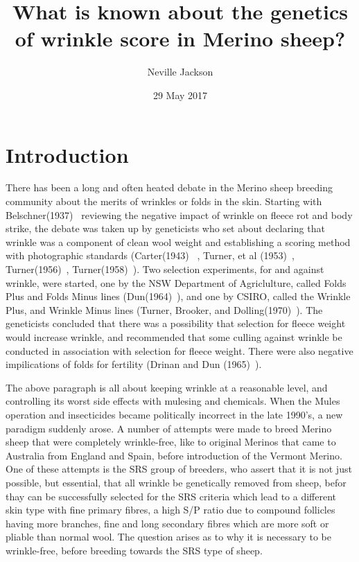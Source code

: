 \documentclass[titlepage]{article}  %
\title{What is known about the genetics of wrinkle score in Merino sheep?}
\author{Neville Jackson}
\date{29 May 2017}
\begin{document}
 
 
\maketitle      
\tableofcontents

\clearpage
\section{Introduction} 
There has been a long and often heated debate in the Merino sheep breeding community about the merits of wrinkles or folds in the skin. Starting with Belschner(1937)~\cite{bels:37} reviewing the negative impact of wrinkle on fleece rot and body strike, the debate was taken up by geneticists who set about declaring that wrinkle was a component of clean wool weight and establishing a scoring method with photographic standards (Carter(1943)~\cite{cart:43} , Turner, et al (1953)~\cite{turn:53},  Turner(1956)~\cite{turn:56}, Turner(1958)~\cite{turn:58}). Two selection experiments, for and against wrinkle, were started, one by the NSW Department of Agriclulture, called Folds Plus and Folds Minus lines (Dun(1964)~\cite{dun:64}), and one by CSIRO, called the Wrinkle Plus, and Wrinkle Minus lines (Turner, Brooker, and Dolling(1970)~\cite{turn:70}). The geneticists concluded that there was a possibility that selection for fleece weight would increase wrinkle, and recommended that some culling against wrinkle be conducted in association with selection for fleece weight. There were also negative impilications of folds for fertility (Drinan and Dun (1965)~\cite{drin:65}).

The above paragraph is all about keeping wrinkle at a reasonable level, and controlling its worst side effects with mulesing and chemicals. When the Mules operation  and insecticides became politically incorrect in the late 1990's, a new paradigm suddenly arose.  A number of attempts were made to breed Merino sheep that were completely wrinkle-free, like to original Merinos that came to Australia from England and Spain, before introduction of the  Vermont Merino.  One of these attempts is the SRS group of breeders, who assert that it is not just possible, but essential, that all wrinkle be genetically removed from sheep, befor thay can be successfully selected for the SRS criteria which lead to a different skin type with fine primary fibres, a high S/P ratio due to compound follicles having more branches, fine and long secondary fibres which are more soft or pliable than normal wool. The question arises as to why it is necessary to be wrinkle-free, before breeding towards the SRS type of sheep.
\end{document}
